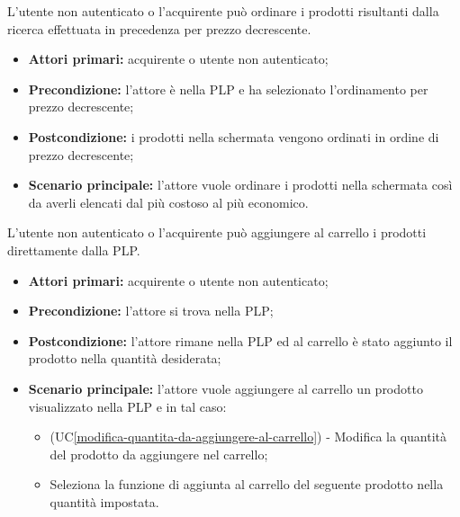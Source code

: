 L'utente non autenticato o l'acquirente può ordinare i prodotti risultanti dalla ricerca effettuata in precedenza per prezzo decrescente.
\begin{itemize}
    \item \textbf{Attori primari:} acquirente o utente non autenticato;
    \item \textbf{Precondizione:} l'attore è nella PLP e ha selezionato l'ordinamento per prezzo decrescente;
    \item \textbf{Postcondizione:} i prodotti nella schermata vengono ordinati in ordine di prezzo decrescente;
    \item \textbf{Scenario principale:} l'attore vuole ordinare i prodotti nella schermata così da averli elencati dal più costoso al più economico.
\end{itemize}


\label{aggiunta-carrello-plp}

L'utente non autenticato o l'acquirente può aggiungere al carrello i prodotti direttamente dalla PLP.
\begin{itemize}
    \item \textbf{Attori primari:} acquirente o utente non autenticato;
    \item \textbf{Precondizione:} l'attore si trova nella PLP;
    \item \textbf{Postcondizione:} l'attore rimane nella PLP ed al carrello è stato aggiunto il prodotto nella quantità desiderata;
    \item \textbf{Scenario principale:} l'attore vuole aggiungere al carrello un prodotto visualizzato nella PLP e in tal caso:
    \begin{itemize}
        \item (UC\ref{modifica-quantita-da-aggiungere-al-carrello}) - Modifica la quantità del prodotto da aggiungere nel carrello;
        \item Seleziona la funzione di aggiunta al carrello del seguente prodotto nella quantità impostata.
    \end{itemize}
\end{itemize}
